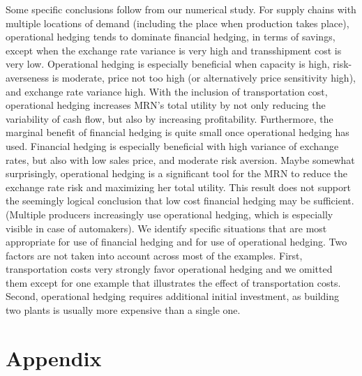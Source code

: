 \documentclass[mnsc,nonblindrev,copyedit]{informs2_wz} %
\begin{document}
Some specific conclusions follow from our numerical study.
For supply chains with multiple locations of demand (including the place when production takes place), operational hedging tends to dominate financial hedging, in terms of savings, except when the exchange rate variance is very high and transshipment cost is very low.  Operational hedging is especially beneficial when capacity is high, risk-averseness is moderate, price not too high (or alternatively price sensitivity high), and exchange rate variance high.  With the inclusion of transportation cost, operational hedging increases MRN's total utility by not only reducing the variability of cash flow, but also by increasing profitability.  Furthermore, the marginal benefit of financial hedging is quite small once operational hedging has used.  Financial hedging is especially beneficial with high variance of exchange rates, but also with low sales price, and moderate risk aversion.  Maybe somewhat surprisingly, operational hedging is a significant tool for the MRN to reduce the exchange rate risk and maximizing her total utility.  This result does not support the seemingly logical conclusion that low cost financial hedging may be sufficient.  (Multiple producers increasingly use operational hedging, which is especially visible in case of automakers).  We identify specific situations that are most appropriate for use of financial hedging and for use of operational hedging.  Two factors are not taken into account across most of the examples.  First, transportation costs very strongly favor operational hedging and we omitted them except for one example that illustrates the effect of transportation costs.  Second, operational hedging requires additional initial investment, as building two plants is usually more expensive than a single one.




\section{Appendix}
\end{document}

